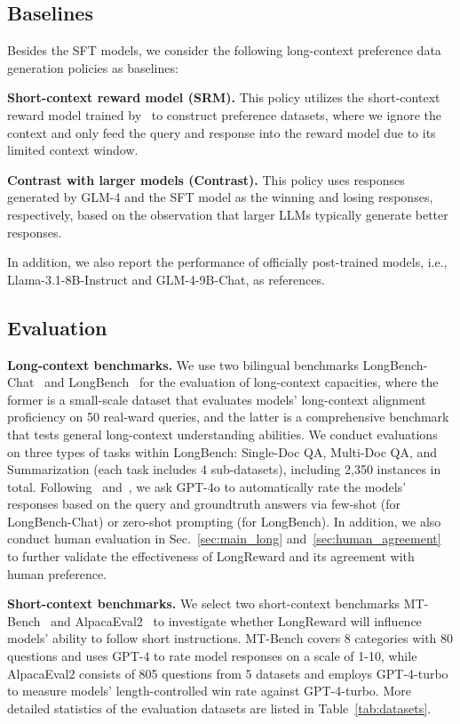 \subsection{Baselines}
Besides the SFT models, we consider the following long-context preference data generation policies as baselines:

\noindent\textbf{Short-context reward model (SRM).} This policy utilizes the short-context reward model trained by~\citet{chatglm-rlhf} to construct preference datasets, where we ignore the context and only feed the query and response into the reward model due to its limited context window.  

\noindent\textbf{Contrast with larger models (Contrast).} This policy uses responses generated by GLM-4 and the SFT model as the winning and losing responses, respectively, based on the observation that larger LLMs typically generate better responses.

In addition, we also report the performance of officially post-trained models, i.e., Llama-3.1-8B-Instruct and GLM-4-9B-Chat, as references.

\subsection{Evaluation} 
\noindent\textbf{Long-context benchmarks.} We use two bilingual benchmarks LongBench-Chat~\cite{longalign} and LongBench~\cite{longbench} for the evaluation of long-context capacities, where the former is a small-scale dataset that evaluates models’ long-context alignment proficiency on 50 real-ward queries, and the latter is a comprehensive benchmark that tests general long-context understanding abilities. We conduct evaluations on three types of tasks within LongBench: Single-Doc QA, Multi-Doc QA, and Summarization (each task includes 4 sub-datasets), including 2,350 instances in total. Following~\citet{longalign} and~\cite{longcite}, we ask GPT-4o to automatically rate the models' responses based on the query and groundtruth answers via few-shot (for LongBench-Chat) or zero-shot prompting (for LongBench). In addition, we also conduct human evaluation in Sec.~\ref{sec:main_long} and~\ref{sec:human_agreement} to further validate the effectiveness of LongReward and its agreement with human preference.

\noindent\textbf{Short-context benchmarks.} We select two short-context benchmarks MT-Bench~\cite{mt-bench} and AlpacaEval2~\cite{alpacaeval2} to investigate whether LongReward will influence models' ability to follow short instructions. MT-Bench  covers 8 categories with
80 questions and uses GPT-4 to rate model responses on a scale of 1-10, while AlpacaEval2 consists of 805 questions from 5 datasets and employs GPT-4-turbo to measure models' length-controlled win rate against GPT-4-turbo. More detailed statistics of the evaluation datasets are listed in Table~\ref{tab:datasets}. 

